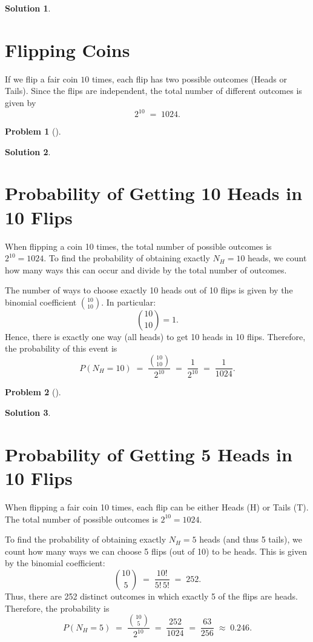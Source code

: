 \documentclass[12pt]{article}
\theoremstyle{definition} %
\newtheorem{solution}{Solution}
\newtheorem{problem}{Problem}
\theoremstyle{plain} %
\begin{document}
\begin{solution}
    \section*{Flipping Coins}

If we flip a fair coin $10$ times, each flip has two possible outcomes 
(Heads or Tails). Since the flips are independent, the total number of 
different outcomes is given by
\[
2^{10} \;=\; 1024.
\]
\end{solution}
\begin{problem}[]
    
\end{problem}
\begin{solution}
    \section*{Probability of Getting 10 Heads in 10 Flips}

When flipping a coin 10 times, the total number of possible outcomes is 
\(2^{10} = 1024\). To find the probability of obtaining exactly 
\(N_H = 10\) heads, we count how many ways this can occur and divide by 
the total number of outcomes.

The number of ways to choose exactly 10 heads out of 10 flips is given by 
the binomial coefficient \(\binom{10}{10}\). In particular:
\[
\binom{10}{10} = 1.
\]
Hence, there is exactly one way (all heads) to get 10 heads in 10 flips. 
Therefore, the probability of this event is
\[
P(N_H = 10) 
\;=\; \frac{\binom{10}{10}}{2^{10}}
\;=\; \frac{1}{2^{10}}
\;=\; \frac{1}{1024}.
\]
\end{solution}
\begin{problem}[]
    
\end{problem}
\begin{solution}
    \section*{Probability of Getting 5 Heads in 10 Flips}

When flipping a fair coin 10 times, each flip can be either Heads (H) 
or Tails (T). The total number of possible outcomes is \(2^{10} = 1024.\)

To find the probability of obtaining exactly \(N_H = 5\) heads (and 
thus 5 tails), we count how many ways we can choose 5 flips (out of 10) 
to be heads. This is given by the binomial coefficient:
\[
\binom{10}{5} \;=\; \frac{10!}{5!\,5!} \;=\; 252.
\]
Thus, there are 252 distinct outcomes in which exactly 5 of the flips 
are heads. Therefore, the probability is
\[
P(N_H = 5) 
\;=\; \frac{\binom{10}{5}}{2^{10}}
\;=\; \frac{252}{1024}
\;=\; \frac{63}{256}
\;\approx\; 0.246.
\]
\end{solution}
\end{document}
